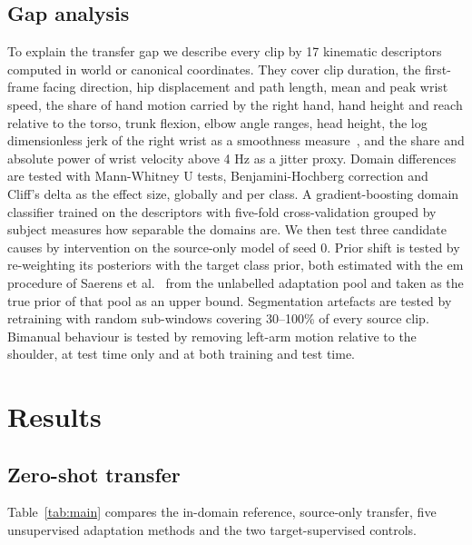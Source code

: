 \documentclass[pdflatex,sn-mathphys-num]{sn-jnl}
\begin{document}
\subsection{Gap analysis}

To explain the transfer gap we describe every clip by 17 kinematic descriptors
computed in world or canonical coordinates. They cover clip duration, the
first-frame facing direction, hip displacement and path length, mean and peak
wrist speed, the share of hand motion carried by the right hand, hand height
and reach relative to the torso, trunk flexion, elbow angle ranges, head
height, the log dimensionless jerk of the right wrist as a smoothness
measure~\cite{balasubramanian2015smoothness}, and the share and absolute power
of wrist velocity above 4 Hz as a jitter proxy. Domain differences are tested
with Mann-Whitney U tests, Benjamini-Hochberg correction and Cliff's delta as
the effect size, globally and per class. A gradient-boosting domain classifier
trained on the descriptors with five-fold cross-validation grouped by subject
measures how separable the domains are. We then test three candidate causes by
intervention on the source-only model of seed 0. Prior shift is tested by
re-weighting its posteriors with the target class prior, both estimated with
the \ac{em} procedure of Saerens et al.~\cite{saerens2002priors} from the
unlabelled adaptation pool and taken as the true prior of that pool as an upper
bound. Segmentation artefacts are tested by retraining with random sub-windows
covering 30--100\% of every source clip. Bimanual behaviour is tested by
removing left-arm motion relative to the shoulder, at test time only and at
both training and test time.

\section{Results}
\label{sec:results}

\subsection{Zero-shot transfer}

Table~\ref{tab:main} compares the in-domain reference, source-only transfer,
five unsupervised adaptation methods and the two target-supervised controls.
\end{document}
